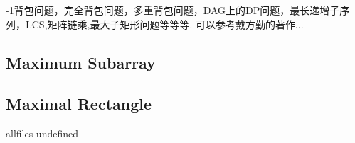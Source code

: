 \documentclass{article}
\begin{document}
\begin{CJK}{UTF8}{gbsn}     %

\else
    
-1背包问题，完全背包问题，多重背包问题，DAG上的DP问题，最长递增子序列，LCS,矩阵链乘,最大子矩形问题等等等. 可以参考戴方勤的著作...
\subsection{Maximum Subarray}

\subsection{Maximal Rectangle}


\fi

\ifx allfiles undefined
\end{CJK}
\end{document}
